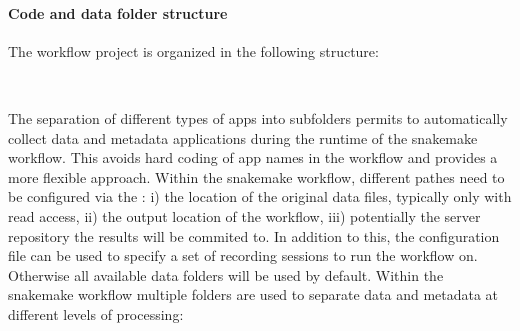 \paragraph{Code and data folder structure}
The workflow project is organized in the following structure:\\

\renewcommand*\DTstylecomment{\color{gray}\textit}
\renewcommand*\DTstyle{\textcolor{black!90}}
\begin{minipage}[t]{\textwidth}
\ \\
\end{minipage}

The separation of different types of apps into subfolders permits to automatically collect data and metadata applications during the runtime of the snakemake workflow. This avoids hard coding of app names in the workflow and provides a more flexible approach.
Within the snakemake workflow, different pathes need to be configured via the : i) the location of the original data files, typically only with read access, ii) the output location of the workflow, iii) potentially the server repository the results will be commited to. In addition to this, the configuration file can be used to specify a set of recording sessions to run the workflow on. Otherwise all available data folders will be used by default.
Within the snakemake workflow multiple folders are used to separate data and metadata at different levels of processing:\\

